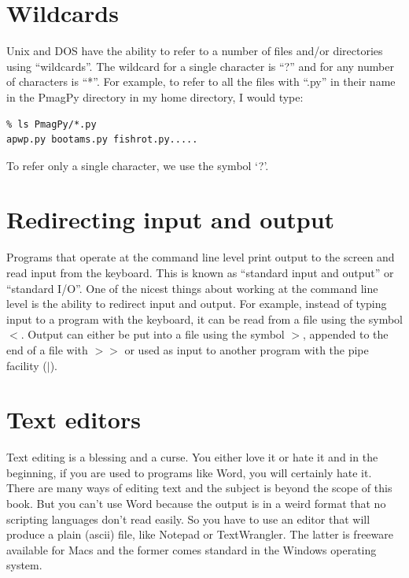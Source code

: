 \documentclass[11pt]{book}
\begin{document}
\section {Wildcards}

Unix and DOS have the ability to refer to a number of files and/or directories using
``wildcards''.  The  wildcard for a  single character is ``?'' and for any number of
characters is ``*''.  For example, to refer to all the files with ``.py'' in their name in the PmagPy directory in my home directory, 
I would type:

\begin{verbatim}
% ls PmagPy/*.py
apwp.py bootams.py fishrot.py.....
\end{verbatim}


 To refer only a single character, we use the symbol `?'. 




\section {Redirecting input and output}

Programs that operate at the command line level print  output to the screen and read input
from the keyboard. This is
known as ``standard input and output'' or ``standard I/O''.
One of the nicest things about working at the command line level is the ability to redirect input and output.
For example, instead of typing input to a program with the keyboard, it can
be read from a file using the symbol {\bf $<$}.   Output can either be put into a 
file using the symbol {\bf $>$}, appended to the end of a file with {\bf $>>$} or 
used as input to another program with the pipe facility ({\bf$ |$}).



\section{Text editors}

Text editing is a blessing and a curse.  You either love it or
hate it and in the beginning, if you are used to programs like Word, you will certainly hate it.  There are many ways of
editing text and the subject is beyond the scope of this book.   But you can't use Word because the output is in a weird format that no scripting languages don't read easily.  So you have to use an editor that will produce a plain (ascii) file, like Notepad or TextWrangler.   The latter is freeware available for Macs and the former comes standard in the Windows operating system.  
\end{document}
